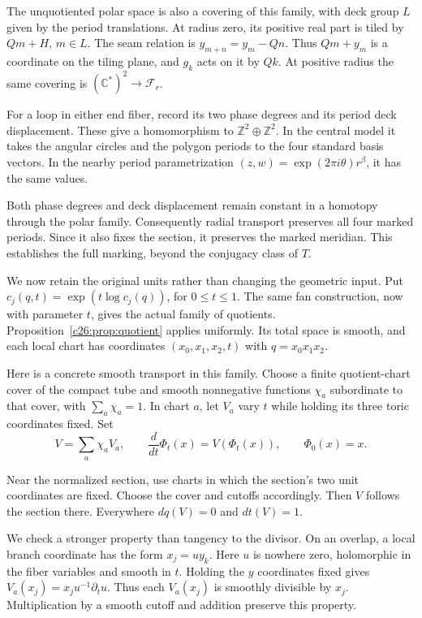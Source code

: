 The unquotiented polar space is also a covering of this family,
with deck group $L$ given by the period translations.
At radius zero, its positive real part is tiled by $Qm+H$, $m\in L$.
The seam relation is $y_{m+n}=y_m-Qn$.
Thus $Qm+y_m$ is a coordinate on the tiling plane,
and $g_k$ acts on it by $Qk$.
At positive radius the same covering is
$(\mathbb C^*)^2\to\mathcal F_r$.

For a loop in either end fiber, record its two phase degrees and its
period deck displacement. These give a homomorphism to
$\mathbb Z^2\oplus\mathbb Z^2$.
In the central model it takes the angular circles and the polygon
periods to the four standard basis vectors.
In the nearby period parametrization
$(z,w)=\exp(2\pi i\theta)r^\beta$, it has the same values.

Both phase degrees and deck displacement remain constant in a homotopy
through the polar family.
Consequently radial transport preserves all four marked periods.
Since it also fixes the section, it preserves the marked meridian.
This establishes the full marking, beyond the conjugacy class of $T$.

We now retain the original units rather than changing the geometric input.
Put $c_j(q,t)=\exp(t\log c_j(q))$, for $0\le t\le1$.
The same fan construction, now with parameter $t$, gives the actual
family of quotients. Proposition~\ref{c26:prop:quotient} applies uniformly.
Its total space is smooth, and each local chart has coordinates
$(x_0,x_1,x_2,t)$ with $q=x_0x_1x_2$.

Here is a concrete smooth transport in this family.
Choose a finite quotient-chart cover of the compact tube and smooth
nonnegative functions $\chi_a$ subordinate to that cover, with
$\sum_a\chi_a=1$. In chart $a$, let $V_a$ vary $t$ while holding its
three toric coordinates fixed. Set
\begin{equation}\label{c26:eq:transport}
V=\sum_a\chi_a V_a,
\qquad \frac{d}{dt}\Phi_t(x)=V(\Phi_t(x)),\qquad \Phi_0(x)=x.
\end{equation}

Near the normalized section, use charts in which the section's two
unit coordinates are fixed. Choose the cover and cutoffs accordingly.
Then $V$ follows the section there. Everywhere $dq(V)=0$ and
$dt(V)=1$.

We check a stronger property than tangency to the divisor.
On an overlap, a local branch coordinate has the form $x_j=u y_k$.
Here $u$ is nowhere zero, holomorphic in the fiber variables and smooth in $t$.
Holding the $y$ coordinates fixed gives
$V_a(x_j)=x_j u^{-1}\partial_tu$.
Thus each $V_a(x_j)$ is smoothly divisible by $x_j$.
Multiplication by a smooth cutoff and addition preserve this property.

